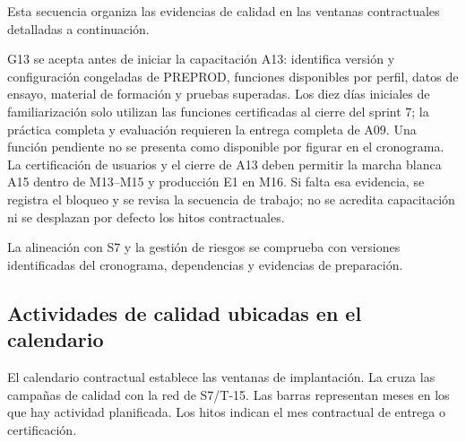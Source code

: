 Esta secuencia organiza las evidencias de calidad en las ventanas contractuales detalladas a continuación.

G13 se acepta antes de iniciar la capacitación A13: identifica versión y configuración congeladas de PREPROD, funciones disponibles por perfil, datos de ensayo, material de formación y pruebas superadas. Los diez días iniciales de familiarización solo utilizan las funciones certificadas al cierre del sprint 7; la práctica completa y evaluación requieren la entrega completa de A09. Una función pendiente no se presenta como disponible por figurar en el cronograma. La certificación de usuarios y el cierre de A13 deben permitir la marcha blanca A15 dentro de M13--M15 y producción E1 en M16. Si falta esa evidencia, se registra el bloqueo y se revisa la secuencia de trabajo; no se acredita capacitación ni se desplazan por defecto los hitos contractuales.

La alineación con S7 y la gestión de riesgos se comprueba con versiones identificadas del cronograma, dependencias y evidencias de preparación.



\subsection{Actividades de calidad ubicadas en el calendario}\label{sec:9-calendario-pruebas}

El calendario contractual establece las ventanas de implantación. La  cruza las campañas de calidad con la red de S7/T-15. Las barras representan meses en los que hay actividad planificada. Los hitos indican el mes contractual de entrega o certificación.

